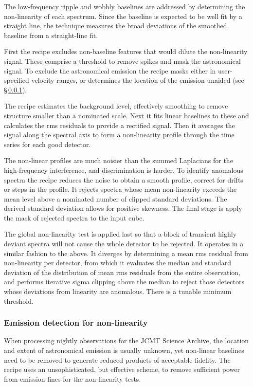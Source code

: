 \documentclass[useAMS,usenatbib]{mn2e}
\begin{document}
The low-frequency ripple and wobbly baselines are addressed by
determining the non-linearity of each spectrum.  Since the baseline
is expected to be well fit by a straight line, the technique
measures the broad deviations of the smoothed baseline from a
straight-line fit.

First the recipe excludes non-baseline features that would dilute the
non-linearity signal.  These comprise a threshold to remove spikes and
mask the astronomical signal.  To exclude the astronomical emission
the recipe masks either in user-specified velocity ranges, or
determines the location of the emission unaided (see
\S\,\ref{sec:emission_detection}).

The recipe estimates the background level, effectively smoothing to
remove structure smaller than a nominated scale.  Next it fits linear
baselines to these and calculates the rms residuals to provide a
rectified signal.  Then it averages the signal along the spectral axis
to form a non-linearity profile through the time series for each good
detector.

The non-linear profiles are much noisier than the summed Laplacians
for the high-frequency interference, and discrimination is harder.  To
identify anomalous spectra the recipe reduces the noise to obtain a
smooth profile, correct for drifts or steps in the profile.  It
rejects spectra whose mean non-linearity exceeds the mean level above
a nominated number of clipped standard deviations.  The derived
standard deviation allows for positive skewness.  The final stage
is apply the mask of rejected spectra to the input cube.

The global non-linearity test is applied last so that a block of
transient highly deviant spectra will not cause the whole detector to
be rejected.  It operates in a similar fashion to the above.  It
diverges by determining a mean rms residual from non-linearity per
detector, from which it evaluates the median and standard deviation of
the distribution of mean rms residuals from the entire observation,
and performs iterative sigma clipping above the median to reject those
detectors whose deviations from linearity are anomalous.  There is a
tunable minimum threshold.

\subsubsection{Emission detection for non-linearity}
\label{sec:emission_detection}

When processing nightly observations for the JCMT Science Archive, the
location and extent of astronomical emission is usually unknown, yet
non-linear baselines need to be removed to generate reduced products
of acceptable fidelity.  The recipe uses an unsophisticated, but
effective scheme, to remove sufficient power from emission lines for
the non-linearity tests.
\end{document}
